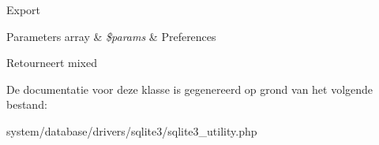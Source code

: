 Export


\begin{DoxyParams}[1]{Parameters}
array & {\em \$params} & Preferences \\
\hline
\end{DoxyParams}
\begin{DoxyReturn}{Retourneert}
mixed 
\end{DoxyReturn}


De documentatie voor deze klasse is gegenereerd op grond van het volgende bestand\+:\begin{DoxyCompactItemize}
\item 
system/database/drivers/sqlite3/sqlite3\+\_\+utility.\+php\end{DoxyCompactItemize}
